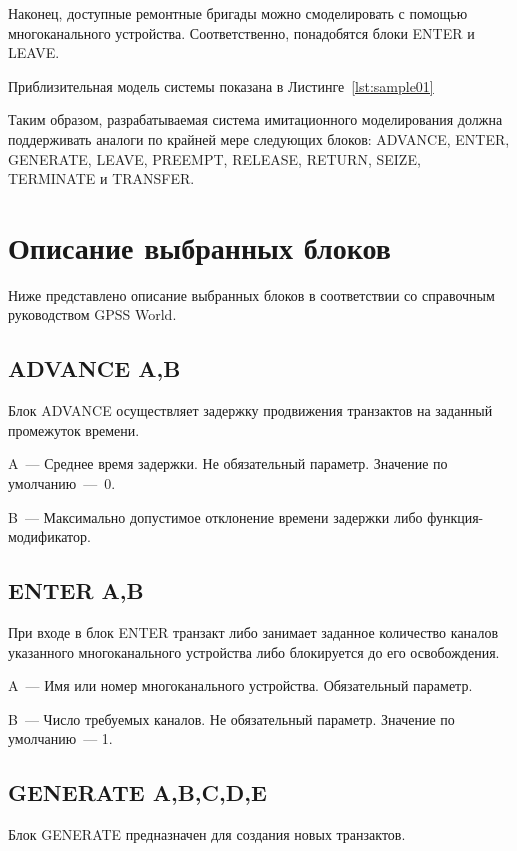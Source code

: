 Наконец, доступные ремонтные бригады можно смоделировать с помощью многоканального устройства. Соответственно, понадобятся блоки ENTER и LEAVE.

Приблизительная модель системы показана в Листинге~\ref{lst:sample01}



Таким образом, разрабатываемая система имитационного моделирования должна поддерживать аналоги по крайней мере следующих блоков: ADVANCE, ENTER, GENERATE, LEAVE, PREEMPT, RELEASE, RETURN, SEIZE, TERMINATE и TRANSFER.

\section{Описание выбранных блоков}

Ниже представлено описание выбранных блоков в соответствии со справочным руководством GPSS World.\cite{GPSSRef}

\subsection*{ADVANCE A,B}

Блок ADVANCE осуществляет задержку продвижения транзактов на заданный промежуток времени.

A~--- Среднее время задержки. Не обязательный параметр. Значение по умолчанию~---~0.

B~--- Максимально допустимое отклонение времени задержки либо функция-модификатор.

\subsection*{ENTER A,B}

При входе в блок ENTER транзакт либо занимает заданное количество каналов указанного многоканального устройства либо блокируется до его освобождения.

A~--- Имя или номер многоканального устройства. Обязательный параметр.

B~--- Число требуемых каналов. Не обязательный параметр. Значение по умолчанию~--- 1.

\subsection*{GENERATE A,B,C,D,E}

Блок GENERATE предназначен для создания новых транзактов.

